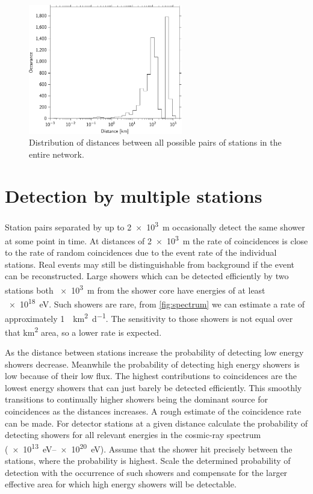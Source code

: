 \begin{figure}
    \centering
    \includegraphics[width=0.6\textwidth]
                    {plots/cluster/station_distances_all}
    \caption{Distribution of distances between all possible pairs of stations in the entire \hisparc network.}
    \label{fig:station_distances_all}
\end{figure}


\section{Detection by multiple stations}
\label{sec:detection-multiple-stations}

Station pairs separated by up to \SI{2e3}{\meter} occasionally detect the same shower at some point in time. At distances of \SI{2e3}{\meter} the rate of coincidences is close to the rate of random coincidences due to the event rate of the individual stations. Real events may still be distinguishable from background if the event can be reconstructed. Large showers which can be detected efficiently by two stations both \SI{e3}{\meter} from the shower core have energies of at least \SI{e18}{\eV}. Such showers are rare, from \cref{fig:spectrum} we can estimate a rate of approximately \SI{1}{\per\kilo\meter\squared\per\day}. The sensitivity to those showers is not equal over that \si{\kilo\meter\squared} area, so a lower rate is expected.

As the distance between stations increase the probability of detecting low energy showers decrease. Meanwhile the probability of detecting high energy showers is low because of their low flux. The highest contributions to coincidences are the lowest energy showers that can just barely be detected efficiently. This smoothly transitions to continually higher showers being the dominant source for coincidences as the distances increases. A rough estimate of the coincidence rate can be made. For detector stations at a given distance calculate the probability of detecting showers for all relevant energies in the cosmic-ray spectrum (\SIrange{e13}{e20}{\eV}). Assume that the shower hit precisely between the stations, where the probability is highest. Scale the determined probability of detection with the occurrence of such showers and compensate for the larger effective area for which high energy showers will be detectable.

